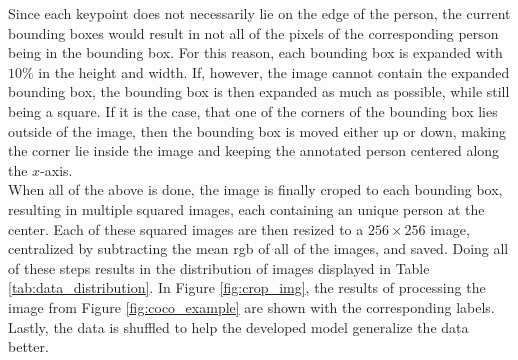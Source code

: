 \documentclass[main.tex]{subfiles}
\begin{document}
Since each keypoint does not necessarily lie on the edge of the person, the current bounding boxes would result in not all of the pixels of the corresponding person being in the bounding box. For this reason, each bounding box is expanded with $10\%$ in the height and width. If, however, the image cannot contain the expanded bounding box, the bounding box is then expanded as much as possible, while still being a square. If it is the case, that one of the corners of the bounding box lies outside of the image, then the bounding box is moved either up or down, making the corner lie inside the image and keeping the annotated person centered along the $x$-axis. \\
When all of the above is done, the image is finally croped to each bounding box, resulting in multiple squared images, each containing an unique person at the center. Each of these squared images are then resized to a $256 \times 256$ image, centralized by subtracting the mean rgb of all of the images, and saved. Doing all of these steps results in the distribution of images displayed in Table \ref{tab:data_distribution}. In Figure \ref{fig:crop_img}, the results of processing the image from Figure \ref{fig:coco_example} are shown with the corresponding labels. Lastly, the data is shuffled to help the developed model generalize the data better.
\end{document}
